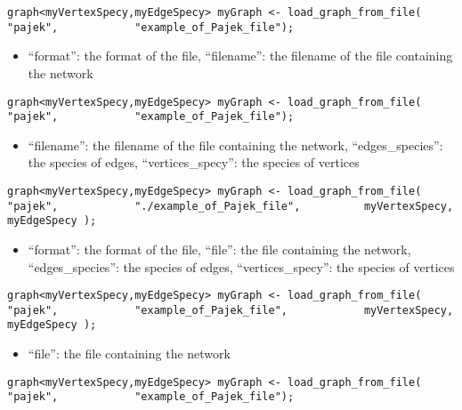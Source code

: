 \documentclass[]{book}
\providecommand{\tightlist}{%
  \setlength{\itemsep}{0pt}\setlength{\parskip}{0pt}}
\theoremstyle{definition}
\theoremstyle{definition}
\theoremstyle{definition}
\theoremstyle{remark}
\begin{document}
\begin{verbatim}
graph<myVertexSpecy,myEdgeSpecy> myGraph <- load_graph_from_file(           "pajek",            "example_of_Pajek_file"); 
\end{verbatim}

\begin{itemize}
\tightlist
\item
  ``format'': the format of the file, ``filename'': the filename of the
  file containing the network
\end{itemize}

\begin{verbatim}
graph<myVertexSpecy,myEdgeSpecy> myGraph <- load_graph_from_file(           "pajek",            "example_of_Pajek_file"); 
\end{verbatim}

\begin{itemize}
\tightlist
\item
  ``filename'': the filename of the file containing the network,
  ``edges\_species'': the species of edges, ``vertices\_specy'': the
  species of vertices
\end{itemize}

\begin{verbatim}
graph<myVertexSpecy,myEdgeSpecy> myGraph <- load_graph_from_file(           "pajek",            "./example_of_Pajek_file",          myVertexSpecy,          myEdgeSpecy ); 
\end{verbatim}

\begin{itemize}
\tightlist
\item
  ``format'': the format of the file, ``file'': the file containing the
  network, ``edges\_species'': the species of edges,
  ``vertices\_specy'': the species of vertices
\end{itemize}

\begin{verbatim}
graph<myVertexSpecy,myEdgeSpecy> myGraph <- load_graph_from_file(           "pajek",            "example_of_Pajek_file",            myVertexSpecy,          myEdgeSpecy ); 
\end{verbatim}

\begin{itemize}
\tightlist
\item
  ``file'': the file containing the network
\end{itemize}

\begin{verbatim}
graph<myVertexSpecy,myEdgeSpecy> myGraph <- load_graph_from_file(           "pajek",            "example_of_Pajek_file"); 
\end{verbatim}
\end{document}
